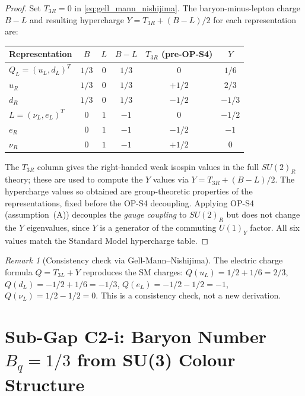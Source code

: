 \documentclass[12pt,a4paper]{article}
\theoremstyle{definition}
\theoremstyle{remark}
\newtheorem{remark}[theorem]{Remark}
\begin{document}
\begin{proof}
Set $T_{3R}=0$ in \eqref{eq:gell_mann_nishijima}.
The baryon-minus-lepton charge $B{-}L$ and resulting hypercharge
$Y = T_{3R} + (B{-}L)/2$ for each representation are:
\begin{center}
\begin{tabular}{lccccc}
\toprule
Representation & $B$ & $L$ & $B{-}L$ & $T_{3R}$ (pre-OP-S4) & $Y$ \\
\midrule
$Q_L = (u_L, d_L)^T$ & $1/3$ & $0$ & $1/3$ & $0$ & $1/6$ \\
$u_R$               & $1/3$ & $0$ & $1/3$ & $+1/2$ & $2/3$ \\
$d_R$               & $1/3$ & $0$ & $1/3$ & $-1/2$ & $-1/3$ \\
$L   = (\nu_L, e_L)^T$ & $0$ & $1$ & $-1$ & $0$ & $-1/2$ \\
$e_R$               & $0$ & $1$ & $-1$ & $-1/2$ & $-1$ \\
$\nu_R$             & $0$ & $1$ & $-1$ & $+1/2$ & $0$ \\
\bottomrule
\end{tabular}
\end{center}

\noindent
The $T_{3R}$ column gives the right-handed weak isospin values in the full
$SU(2)_R$ theory; these are used to compute the $Y$ values via
$Y = T_{3R} + (B{-}L)/2$.
The hypercharge values so obtained are group-theoretic properties of the
representations, fixed before the OP-S4 decoupling.
Applying OP-S4 (assumption~(A)) decouples the \emph{gauge coupling} to $SU(2)_R$
but does not change the $Y$ eigenvalues, since $Y$ is a generator of the
commuting $U(1)_Y$ factor.
All six values match the Standard Model hypercharge table.
\end{proof}

\begin{remark}[Consistency check via Gell-Mann--Nishijima]
\label{rem:gm_nishijima}
The electric charge formula $Q = T_{3L} + Y$ reproduces the SM charges:
$Q(u_L) = 1/2 + 1/6 = 2/3$, $Q(d_L) = -1/2 + 1/6 = -1/3$,
$Q(e_L) = -1/2 - 1/2 = -1$, $Q(\nu_L) = 1/2 - 1/2 = 0$.
This is a consistency check, not a new derivation.
\end{remark}

\section{Sub-Gap C2-i: Baryon Number $B_q=1/3$ from SU(3) Colour Structure}
\label{sec:c2i}
\end{document}
